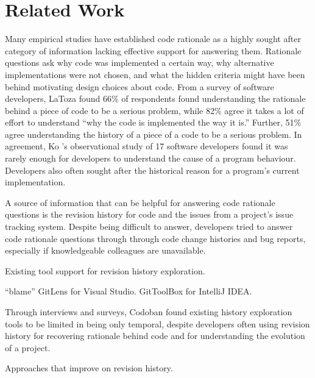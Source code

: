 \chapter{Related Work}
\label{ch:Related-Work}

Many empirical studies have established code rationale as a highly sought after category of information lacking effective support for answering them. \cite{latoza_maintaining_2006, latoza_hard-answer_2010, ko_information_2007}
Rationale questions ask why code was implemented a certain way, why alternative implementations were not chosen, and what the hidden criteria might have been behind motivating design choices about code. \cite{latoza_hard-answer_2010}
From a survey of software developers, LaToza \etal \cite{latoza_maintaining_2006} found 66\% of respondents found understanding the rationale behind a piece of code to be a serious problem, 
while 82\% agree it takes a lot of effort to understand ``why the code is implemented the way it is.''
Further, 51\% agree understanding the history of a piece of a code to be a serious problem. \cite{latoza_maintaining_2006}
In agreement, Ko \etal's observational study of 17 software developers found it was rarely enough for developers to understand the cause of a program behaviour. \cite{ko_information_2007}
Developers also often sought after the historical reason for a program's current implementation. \cite{ko_information_2007}

A source of information that can be helpful for answering code rationale questions is the revision history for code and the issues from a project's issue tracking system. 
Despite being difficult to answer, developers tried to answer code rationale questions through through code change histories and bug reports, especially if knowledgeable colleagues are unavailable. 

Existing tool support for revision history exploration.

 ``blame''
GitLens for Visual Studio.
GitToolBox for IntelliJ IDEA.


Through interviews and surveys, Codoban \etal \cite{codoban_software_2015} found existing history exploration tools to be limited in being only temporal, despite developers often using revision history for recovering rationale behind code and for understanding the evolution of a project.

Approaches that improve on revision history.

